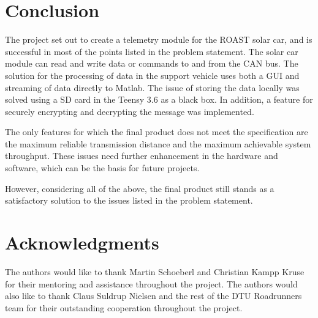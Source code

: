 \documentclass[a4paper,conference]{IEEEtran}
\begin{document}
\section{Conclusion}
The project set out to create a telemetry module for the ROAST solar car, and is successful in most of the points listed in the problem statement. The solar car module can read and write data or commands to and from the CAN bus. The solution for the processing of data in the support vehicle uses both a GUI and streaming of data directly to Matlab. The issue of storing the data locally was solved using a SD card in the Teensy 3.6 as a black box. In addition, a feature for securely encrypting and decrypting the message was implemented.

The only features for which the final product does not meet the specification are the maximum reliable transmission distance and the maximum achievable system throughput. These issues need further enhancement in the hardware and software, which can be the basis for future projects.

However, considering all of the above, the final product still stands as a satisfactory solution to the issues listed in the problem statement.


\section*{Acknowledgments}
The authors would like to thank Martin Schoeberl and Christian Kampp Kruse for their mentoring and assistance throughout the project. The authors would also like to thank Claus Suldrup Nielsen and the rest of the DTU Roadrunners team for their outstanding cooperation throughout the project.

\printbibliography
\end{document}
